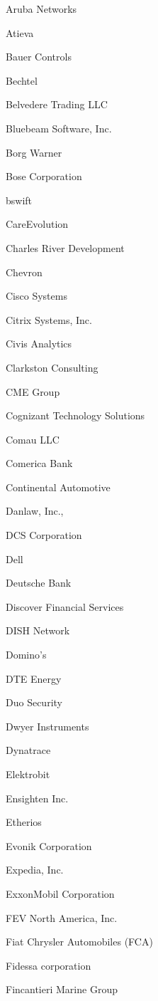\documentclass[twoside]{article}
\begin{document}
\begin{center}
\begin{multicols}{5}
\begin{FlushLeft}
\begin{compactitem}
\item Aruba Networks
\item Atieva
\item Bauer Controls
\item Bechtel
\item Belvedere Trading LLC
\item Bluebeam Software, Inc.
\item Borg Warner
\item Bose Corporation
\item bswift
\item CareEvolution
\item Charles River Development
\item Chevron
\item Cisco Systems
\item Citrix Systems, Inc.
\item Civis Analytics
\item Clarkston Consulting
\item CME Group
\item Cognizant Technology Solutions
\item Comau LLC
\item Comerica Bank
\item Continental Automotive
\item Danlaw, Inc.,
\item DCS Corporation
\item Dell
\item Deutsche Bank
\item Discover Financial Services
\item DISH Network
\item Domino's
\item DTE Energy
\item Duo Security
\item Dwyer Instruments
\item Dynatrace
\item Elektrobit
\item Ensighten Inc.
\item Etherios
\item Evonik Corporation
\item Expedia, Inc.
\item ExxonMobil Corporation
\item FEV North America, Inc.
\item Fiat Chrysler Automobiles (FCA)
\item Fidessa corporation
\item Fincantieri Marine Group

\end{compactitem}
\end{FlushLeft}
\end{multicols}
\end{center}
\end{document}
